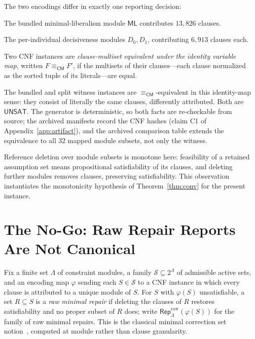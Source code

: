 \documentclass[sigplan,10pt,review,anonymous,nonacm]{acmart}
\theoremstyle{acmdefinition}
\newcommand{\CM}{\equiv_{\mathsf{CM}}}
\newcommand{\Lam}{\Lambda}
\newcommand{\Rep}{\mathsf{Rep}}
\newcommand{\UNSAT}{\mathsf{UNSAT}}
\newcommand{\ML}{\mathsf{ML}}
\begin{document}
The two encodings differ in exactly one reporting decision:
\begin{description}[leftmargin=1.4em]
\item[Bundled.] The bundled minimal-liberalism module $\ML$ contributes
$13{,}826$ clauses.
\item[Split.] The per-individual decisiveness modules
$D_0, D_1$, contributing $6{,}913$ clauses each.
\end{description}

\begin{definition}
\label{def:cm}
Two CNF instances are \emph{clause-multiset equivalent under the identity
variable map}, written $F \CM F'$, if the multisets of their clauses---each
clause normalized as the sorted tuple of its literals---are equal.
\end{definition}

The bundled and split witness instances are $\CM$-equivalent in this
identity-map sense: they consist of literally the same clauses, differently
attributed. Both are $\UNSAT$. The generator is deterministic, so both facts
are re-checkable from source; the archived manifests record the CNF hashes
(claim C1 of Appendix~\ref{app:artifact}), and the archived comparison table
extends the equivalence to all $32$ mapped module subsets, not only the
witness.

Reference deletion over module subsets is monotone here: feasibility of a
retained assumption set means propositional satisfiability of its clauses,
and deleting further modules removes clauses, preserving satisfiability. This
observation instantiates the monotonicity hypothesis of
Theorem~\ref{thm:conv} for the present instance.

\section{The No-Go: Raw Repair Reports Are Not Canonical}
\label{sec:nogo}

Fix a finite set $\Lam$ of constraint modules, a family
$\mathcal{S} \subseteq 2^{\Lam}$ of admissible active sets, and an encoding
map $\varphi$ sending each $S \in \mathcal{S}$ to a CNF instance in which
every clause is attributed to a unique module of $S$. For $S$ with
$\varphi(S)$ unsatisfiable, a set $R \subseteq S$ is a \emph{raw minimal
repair} if deleting the clauses of $R$ restores satisfiability and no proper
subset of $R$ does; write $\Rep^{\mathrm{raw}}_{\Lam}(\varphi(S))$ for the
family of raw minimal repairs. This is the classical minimal correction set
notion~\cite{Reiter1987,LiffitonSakallah2008}, computed at module rather
than clause granularity.
\end{document}

